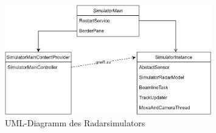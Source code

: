 \begin{figure}[h!]
    \centering
    \includegraphics[width=0.8\textwidth]{content/assets/RadarSimulatorUML.png}
    \caption{UML-Diagramm des Radarsimulators}
\end{figure}



